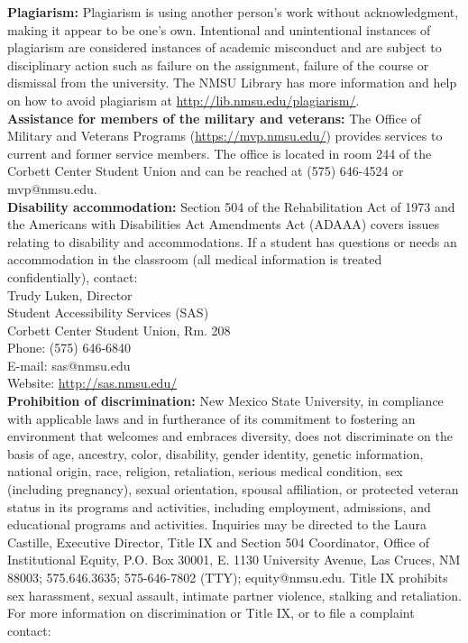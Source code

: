 \documentclass{article}
\begin{document}
\noindent\textbf{Plagiarism:} Plagiarism is using another person's work without acknowledgment, making it appear to be one's own. Intentional and unintentional instances of plagiarism are considered instances of academic misconduct and are subject to disciplinary action such as failure on the assignment, failure of the course or dismissal from the university. The NMSU Library has more information and help on how to avoid plagiarism at \url{http://lib.nmsu.edu/plagiarism/}. \\

\noindent\textbf{Assistance for members of the military and veterans:} The Office of Military and Veterans Programs (\url{https://mvp.nmsu.edu/}) provides services to current and former service members.  The office is located in room 244 of the Corbett Center Student Union and can be reached at (575) 646-4524 or mvp@nmsu.edu. \\

\noindent\textbf{Disability accommodation:} Section 504 of the Rehabilitation Act of 1973 and the Americans with Disabilities Act Amendments Act (ADAAA) covers issues relating to disability and accommodations. If a student has questions or needs an accommodation in the classroom (all medical information is treated confidentially), contact:\\

\noindent Trudy Luken, Director \\
Student Accessibility Services (SAS) \\
Corbett Center Student Union, Rm. 208 \\
Phone: (575) 646-6840 \\
E-mail: sas@nmsu.edu \\
Website: \url{http://sas.nmsu.edu/} \\
 
\noindent\textbf{Prohibition of discrimination:} New Mexico State University, in compliance with applicable laws and in furtherance of its commitment to fostering an environment that welcomes and embraces diversity, does not discriminate on the basis of age, ancestry, color, disability, gender identity, genetic information, national origin, race, religion, retaliation, serious medical condition, sex (including pregnancy), sexual orientation, spousal affiliation, or protected veteran status in its programs and activities, including employment, admissions, and educational programs and activities. Inquiries may be directed to the Laura Castille, Executive Director, Title IX and Section 504 Coordinator, Office of Institutional Equity, P.O. Box 30001, E. 1130 University Avenue, Las Cruces, NM 88003; 575.646.3635; 575-646-7802 (TTY); equity@nmsu.edu. Title IX prohibits sex harassment, sexual assault, intimate partner violence, stalking and retaliation. For more information on discrimination or Title IX, or to file a complaint contact: \\
\end{document}
